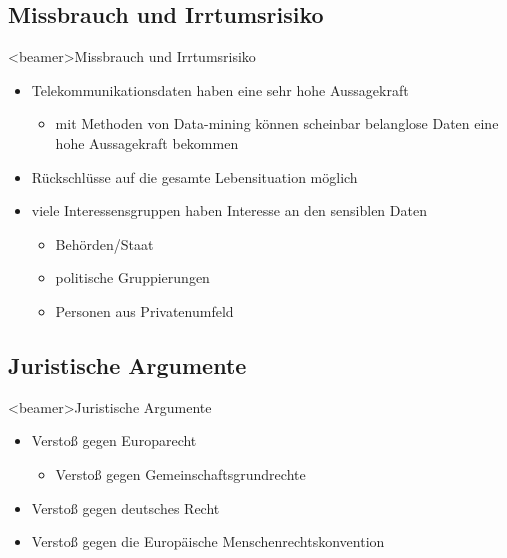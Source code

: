   \subsection*{Missbrauch und Irrtumsrisiko}
    \begin{frame}<beamer>{Missbrauch und Irrtumsrisiko}
      \begin{itemize}
        \item
          Telekommunikationsdaten haben eine sehr hohe Aussagekraft
      \begin{itemize}
         \item mit Methoden von Data-mining können scheinbar belanglose Daten eine hohe Aussagekraft bekommen
      \end{itemize}
        \item
          Rückschlüsse auf die gesamte Lebensituation möglich
 \item viele Interessensgruppen haben Interesse an den sensiblen Daten
          \begin{itemize}
         \item Behörden/Staat
         \item politische Gruppierungen
         \item Personen aus Privatenumfeld
      \end{itemize}
 
      \end{itemize}
    \end{frame}

  \subsection*{Juristische Argumente}
    \begin{frame}<beamer>{Juristische Argumente}
      \begin{itemize}
        \item Verstoß gegen Europarecht
           \begin{itemize}
         \item Verstoß gegen Gemeinschaftsgrundrechte
      \end{itemize}
        \item Verstoß gegen deutsches Recht
        \item Verstoß gegen die Europäische Menschenrechtskonvention
      \end{itemize}
    \end{frame}
    
